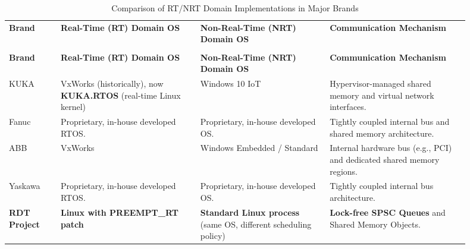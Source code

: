 \renewcommand{\arraystretch}{1.4} %
\begin{longtable}{p{0.1\linewidth} p{0.275\linewidth} p{0.25\linewidth} p{0.275\linewidth}}
    \caption{Comparison of RT/NRT Domain Implementations in Major Brands}\label{tab:brand_implementations}\\
    \toprule %
    \textbf{Brand} &
    \textbf{Real-Time (RT) Domain OS} &
    \textbf{Non-Real-Time (NRT) Domain OS} &
    \textbf{Communication Mechanism} \\
    \addlinespace[3pt] %
    \toprule %
    \endfirsthead

    \multicolumn{4}{c}{\tablename~\thetable{} -- continued from previous page} \\
    \toprule %
    \textbf{Brand} &
    \textbf{Real-Time (RT) Domain OS} &
    \textbf{Non-Real-Time (NRT) Domain OS} &
    \textbf{Communication Mechanism} \\
    \addlinespace[3pt] %
    \toprule %
    \endhead

    \bottomrule %
    \endfoot

    \bottomrule %
    \endlastfoot

    KUKA &
    VxWorks (historically), now \textbf{KUKA.RTOS} (real-time Linux kernel) &
    Windows 10 IoT &
    Hypervisor-managed shared memory and virtual network interfaces. \\
    \midrule %
    Fanuc &
    Proprietary, in-house developed RTOS. &
    Proprietary, in-house developed OS. &
    Tightly coupled internal bus and shared memory architecture. \\
    \midrule %
    ABB &
    VxWorks &
    Windows Embedded / Standard &
    Internal hardware bus (e.g., PCI) and dedicated shared memory regions. \\
    \midrule %
    Yaskawa &
    Proprietary, in-house developed RTOS. &
    Proprietary, in-house developed OS. &
    Tightly coupled internal bus architecture. \\
    \midrule %
    \textbf{RDT Project} &
    \textbf{Linux with PREEMPT\_RT patch} &
    \textbf{Standard Linux process} (same OS, different scheduling policy) &
    \textbf{Lock-free SPSC Queues} and Shared Memory Objects. \\
\end{longtable}

